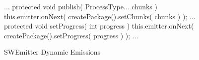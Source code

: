 \begin{figure}[H]
\begin{sourcecode}
\begin{javacode}{}
...
	protected void publish( ProcessType... chunks ) {
		this.emitter.onNext( createPackage().setChunks( chunks ) );
	}
...
	protected void setProgress( int progress ) {
		this.emitter.onNext( createPackage().setProgress( progress ) );
	}
...
\end{javacode}
\caption{SWEmitter Dynamic Emissions}
\label{code:swemitter-dynamic-emissions}
\end{sourcecode}
\end{figure}